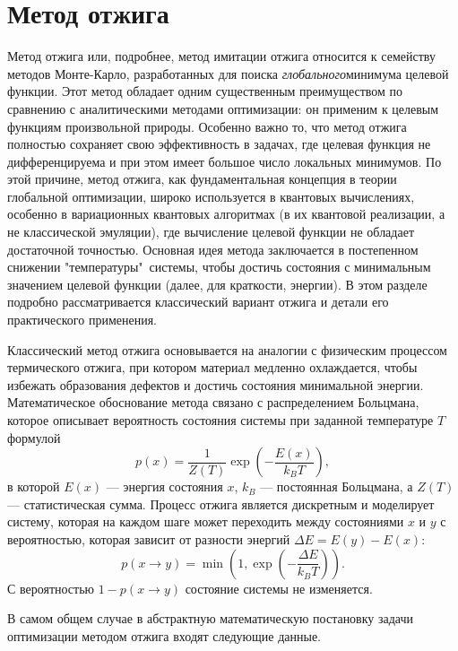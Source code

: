 \documentclass[a4paper]{report}
\begin{document}
\section{Метод отжига}\label{MethAnn}

Метод отжига или, подробнее, метод имитации отжига относится к семейству методов Монте-Карло, разработанных для поиска \textit{глобального}\linebreak минимума целевой функции. Этот метод обладает одним существенным преимуществом по сравнению с аналитическими методами оптимизации: он применим к целевым функциям произвольной природы. Особенно важно то, что метод отжига полностью сохраняет свою эффективность в задачах, где целевая функция не дифференцируема и при этом имеет большое число локальных минимумов. По этой причине, метод отжига, как фундаментальная концепция в теории глобальной оптимизации, широко используется в квантовых вычислениях, особенно в вариационных квантовых алгоритмах (в их квантовой реализации, а не классической эмуляции), где вычисление целевой функции не обладает достаточной точностью. Основная идея метода заключается в постепенном снижении "температуры"\, системы, чтобы достичь состояния с минимальным значением целевой функции (далее, для краткости, энергии). В этом разделе подробно рассматривается классический вариант отжига и детали его практического применения.

Классический метод отжига основывается на аналогии с физическим процессом термического отжига, при котором материал медленно охлаждается, чтобы избежать образования дефектов и достичь состояния минимальной энергии. Математическое обоснование метода связано с распределением Больцмана, которое описывает вероятность состояния системы при заданной температуре $T$ формулой
\begin{equation}
p(x) = \frac{1}{Z(T)} \exp\left(-\frac{E(x)}{k_B T}\right), \nonumber
\end{equation}
в которой $E(x)$ — энергия состояния $x$, $k_B$ — постоянная Больцмана, а $Z(T)$ — статистическая сумма. Процесс отжига является дискретным и моделирует систему, которая на каждом шаге может переходить между состояниями $x$ и $y$ с вероятностью, которая зависит от разности энергий $\Delta E= E(y)-E(x)$:
\begin{equation}\label{prob}
p(x\rightarrow y) = \min\left(1, \exp\left(-\frac{\Delta E}{k_B T}\right)\right).
\end{equation}
С вероятностью $1-p(x\rightarrow y)$ состояние системы не изменяется.

В самом общем случае в абстрактную математическую постановку задачи оптимизации методом отжига входят следующие данные.
\end{document}
